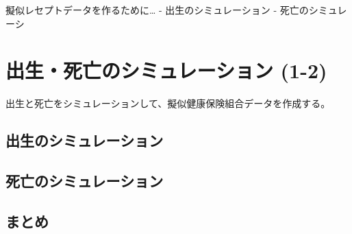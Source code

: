 \documentclass[
]{book}
\begin{document}
擬似レセプトデータを作るために\ldots{}
- 出生のシミュレーション
- 死亡のシミュレーシ

\hypertarget{ux51faux751fux6b7bux4ea1ux306eux30b7ux30dfux30e5ux30ecux30fcux30b7ux30e7ux30f3-1-2}{%
\section{出生・死亡のシミュレーション (1-2)}\label{ux51faux751fux6b7bux4ea1ux306eux30b7ux30dfux30e5ux30ecux30fcux30b7ux30e7ux30f3-1-2}}

出生と死亡をシミュレーションして、擬似健康保険組合データを作成する。

\hypertarget{ux51faux751fux306eux30b7ux30dfux30e5ux30ecux30fcux30b7ux30e7ux30f3}{%
\subsection{出生のシミュレーション}\label{ux51faux751fux306eux30b7ux30dfux30e5ux30ecux30fcux30b7ux30e7ux30f3}}

\hypertarget{ux6b7bux4ea1ux306eux30b7ux30dfux30e5ux30ecux30fcux30b7ux30e7ux30f3}{%
\subsection{死亡のシミュレーション}\label{ux6b7bux4ea1ux306eux30b7ux30dfux30e5ux30ecux30fcux30b7ux30e7ux30f3}}

\hypertarget{ux307eux3068ux3081}{%
\subsection{まとめ}\label{ux307eux3068ux3081}}

  
\end{document}
